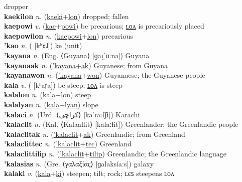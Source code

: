 dropper \label{kaekiles} \\
\textbf{kaekilon} \textit{n.} (\hyperref[kaeki]{kaeki}+\hyperref[lon]{lon})
dropped; fallen \label{kaekilon} \\
\textbf{kaepowi} \textit{v.} (\hyperref[kae]{kae}+\hyperref[powi]{powi})
be precarious; \hyperref[kaepowilon]{ʟᴏᴧ} is precariously placed \label{kaepowi} \\
\textbf{kaepowilon} \textit{n.} (\hyperref[kaepowi]{kaepowi}+\hyperref[lon]{lon})
precarious \label{kaepowilon} \\
\textbf{'kao} \textit{n.} ( [kʰɤ˨˩])
ke (unit) \label{'kao} \\
\textbf{'kayana} \textit{n.} (Eng. ⟨Guyana⟩ [ɡaɪ̯ˈɑːnə])
Guyana \label{'kayana} \\
\textbf{'kayanaak} \textit{n.} (\hyperref['kayana]{'kayana}+\hyperref[ak]{ak})
Guyanese; from Guyana \label{'kayanaak} \\
\textbf{'kayanawon} \textit{n.} (\hyperref['kayana]{'kayana}+\hyperref[won]{won})
Guyanaese; the Guyanese people \label{'kayanawon} \\
\textbf{kala} \textit{v.} ( [kʰaɽa])
be steep; \hyperref[kalalon]{ʟᴏᴧ} is steep \label{kala} \\
\textbf{kalalon} \textit{n.} (\hyperref[kala]{kala}+\hyperref[lon]{lon})
steep \label{kalalon} \\
\textbf{kalalyan} \textit{n.} (\hyperref[kala]{kala}+\hyperref[lyan]{lyan})
slope \label{kalalyan} \\
\textbf{'kalaci} \textit{n.} (Urd. ⟨کراچی‎⟩ [kəˈɾaːt͡ʃi])
Karachi \label{'kalaci} \\
\textbf{'kalaclit} \textit{n.} (Kal. ⟨Kalaallit⟩ [kalaːɬit])
Greenlander; the Greenlandic people \label{'kalaclit} \\
\textbf{'kalaclitak} \textit{n.} (\hyperref['kalaclit]{'kalaclit}+\hyperref[ak]{ak})
Greenlandic; from Greenland \label{'kalaclitak} \\
\textbf{'kalaclittec} \textit{n.} (\hyperref['kalaclit]{'kalaclit}+\hyperref[tec]{tec})
Greenland \label{'kalaclittec} \\
\textbf{'kalaclittilip} \textit{n.} (\hyperref['kalaclit]{'kalaclit}+\hyperref[tilip]{tilip})
Greenlandic; the Greenlandic language \label{'kalaclittilip} \\
\textbf{'kalasias} \textit{n.} (Gre. ⟨γαλαξίας⟩ [ɡalaksíaːs])
galaxy \label{'kalasias} \\
\textbf{kalaki} \textit{v.} (\hyperref[kala]{kala}+\hyperref[ki]{ki})
steepen; tilt; rock; ʟєꜱ steepens ʟᴏᴧ \label{kalaki} \\
